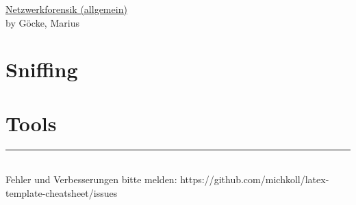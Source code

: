\raggedright
\footnotesize
\begin{multicols}{3}	
	\setlength{\premulticols}{1pt}
	\setlength{\postmulticols}{1pt}
	\setlength{\multicolsep}{1pt}
	\setlength{\columnsep}{2pt}

\begin{center}
     \Large{\underline{Netzwerkforensik (allgemein)}} \\
     \small by Göcke, Marius\\
\end{center}

\section{Sniffing}
\lipsum[1-2]
\section{Tools}
\lipsum[1-2]

\rule{0.3\linewidth}{0.25pt}
\\Fehler und Verbesserungen bitte melden: https://github.com/michkoll/latex-template-cheatsheet/issues
\scriptsize


\end{multicols}